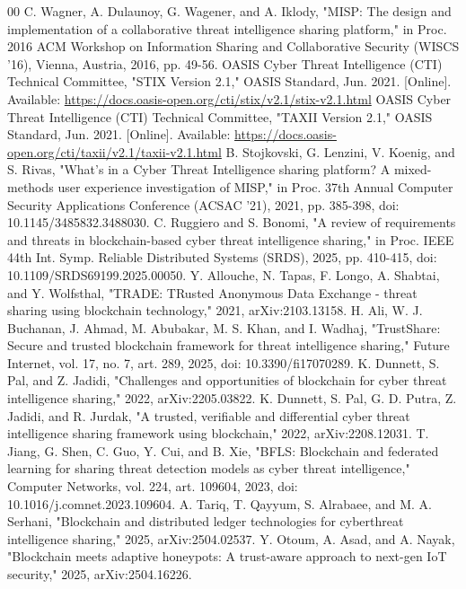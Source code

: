 \documentclass[conference]{IEEEtran}
\begin{document}
\begin{thebibliography}{00}
 C. Wagner, A. Dulaunoy, G. Wagener, and A. Iklody, "MISP: The design and implementation of a collaborative threat intelligence sharing platform," in Proc. 2016 ACM Workshop on Information Sharing and Collaborative Security (WISCS '16), Vienna, Austria, 2016, pp. 49-56.
 OASIS Cyber Threat Intelligence (CTI) Technical Committee, "STIX Version 2.1," OASIS Standard, Jun. 2021. [Online]. Available: \url{https://docs.oasis-open.org/cti/stix/v2.1/stix-v2.1.html}
 OASIS Cyber Threat Intelligence (CTI) Technical Committee, "TAXII Version 2.1," OASIS Standard, Jun. 2021. [Online]. Available: \url{https://docs.oasis-open.org/cti/taxii/v2.1/taxii-v2.1.html}
 B. Stojkovski, G. Lenzini, V. Koenig, and S. Rivas, "What's in a Cyber Threat Intelligence sharing platform? A mixed-methods user experience investigation of MISP," in Proc. 37th Annual Computer Security Applications Conference (ACSAC '21), 2021, pp. 385-398, doi: 10.1145/3485832.3488030.
 C. Ruggiero and S. Bonomi, "A review of requirements and threats in blockchain-based cyber threat intelligence sharing," in Proc. IEEE 44th Int. Symp. Reliable Distributed Systems (SRDS), 2025, pp. 410-415, doi: 10.1109/SRDS69199.2025.00050.
 Y. Allouche, N. Tapas, F. Longo, A. Shabtai, and Y. Wolfsthal, "TRADE: TRusted Anonymous Data Exchange - threat sharing using blockchain technology," 2021, arXiv:2103.13158.
 H. Ali, W. J. Buchanan, J. Ahmad, M. Abubakar, M. S. Khan, and I. Wadhaj, "TrustShare: Secure and trusted blockchain framework for threat intelligence sharing," Future Internet, vol. 17, no. 7, art. 289, 2025, doi: 10.3390/fi17070289.
 K. Dunnett, S. Pal, and Z. Jadidi, "Challenges and opportunities of blockchain for cyber threat intelligence sharing," 2022, arXiv:2205.03822.
 K. Dunnett, S. Pal, G. D. Putra, Z. Jadidi, and R. Jurdak, "A trusted, verifiable and differential cyber threat intelligence sharing framework using blockchain," 2022, arXiv:2208.12031.
 T. Jiang, G. Shen, C. Guo, Y. Cui, and B. Xie, "BFLS: Blockchain and federated learning for sharing threat detection models as cyber threat intelligence," Computer Networks, vol. 224, art. 109604, 2023, doi: 10.1016/j.comnet.2023.109604.
 A. Tariq, T. Qayyum, S. Alrabaee, and M. A. Serhani, "Blockchain and distributed ledger technologies for cyberthreat intelligence sharing," 2025, arXiv:2504.02537.
 Y. Otoum, A. Asad, and A. Nayak, "Blockchain meets adaptive honeypots: A trust-aware approach to next-gen IoT security," 2025, arXiv:2504.16226.

\end{thebibliography}
\end{document}
